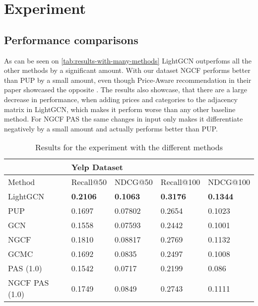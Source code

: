\section{Experiment}


\subsection{Performance comparisons}
As can be seen on \autoref{tab:results-with-many-methods} LightGCN outperfoms all the other methods by a significant amount.
With our dataset NGCF performs better than PUP by a small amount, even though Price-Aware recommendation in their paper showcased the opposite \cite{Priceaware}.
The results also showcase, that there are a large decrease in performance, when adding prices and categories to the adjacency matrix in LightGCN, which makes it perform worse than any other baseline method.
For NGCF PAS the same changes in input only makes it differentiate negatively by a small amount and actually performs better than PUP.

\begin{table*}[h!]
    \centering
    \begin{tabular}{|l|l|l|l|l|}
        \hline
        \rowcolor[HTML]{FFFFFF}
                       & \multicolumn{4}{l|}{\cellcolor[HTML]{FFFFFF}Yelp Dataset}                                                       \\ \hline
        Method         & Recall@50                                                 & NDCG@50         & Recall@100      & NDCG@100        \\ \hline
        LightGCN       & \textbf{0.2106}                                           & \textbf{0.1063} & \textbf{0.3176} & \textbf{0.1344} \\ \hline
        PUP            & 0.1697                                                    & 0.07802         & 0.2654          & 0.1023          \\ \hline
        GCN            & 0.1558                                                    & 0.07593         & 0.2442          & 0.1001          \\ \hline
        NGCF           & 0.1810                                                    & 0.08817         & 0.2769          & 0.1132          \\ \hline
        GCMC           & 0.1692                                                    & 0.0835          & 0.2497          & 0.1008          \\ \hline
        PAS (1.0)      & 0.1542                                                    & 0.0717          & 0.2199          & 0.086           \\ \hline
        NGCF PAS (1.0) & 0.1749                                                    & 0.0849          & 0.2743          & 0.1111          \\ \hline
    \end{tabular}
    \caption{Results for the experiment with the different methods}
    \label{tab:results-with-many-methods}
\end{table*}

